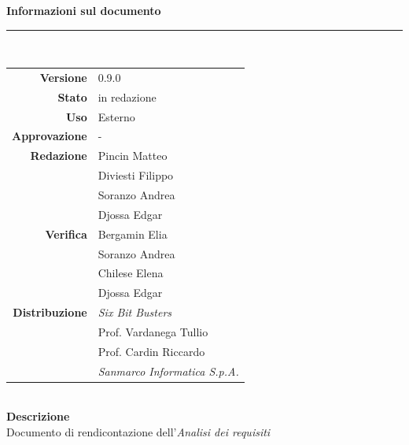 \begin{titlepage}
\begin{center}
	\large \textbf{Informazioni sul documento} \\
	\rule{0.6\textwidth}{0.4pt}
	\\[0.5cm]
	\begin{tabular}{r|l}
		\textbf{Versione} & 0.9.0\\
		\textbf{Stato} & in redazione\\
		\textbf{Uso} & Esterno\\                         
		\textbf{Approvazione} & -\\                      
		\textbf{Redazione} & Pincin Matteo\\ & Diviesti Filippo\\ & Soranzo Andrea \\ & Djossa Edgar \\
		\textbf{Verifica} & Bergamin Elia\\ & Soranzo Andrea \\ & Chilese Elena \\  & Djossa Edgar \\                     
		\textbf{Distribuzione} & \textit{Six Bit Busters} \\ & Prof. Vardanega Tullio \\ & Prof. Cardin Riccardo \\ & \textit{Sanmarco Informatica S.p.A.}
	\end{tabular}	
	\\[0.8cm]

	\large \textbf{Descrizione} \\ Documento di rendicontazione dell'\textit{Analisi dei requisiti}
	
	\end{center}
\end{titlepage}
